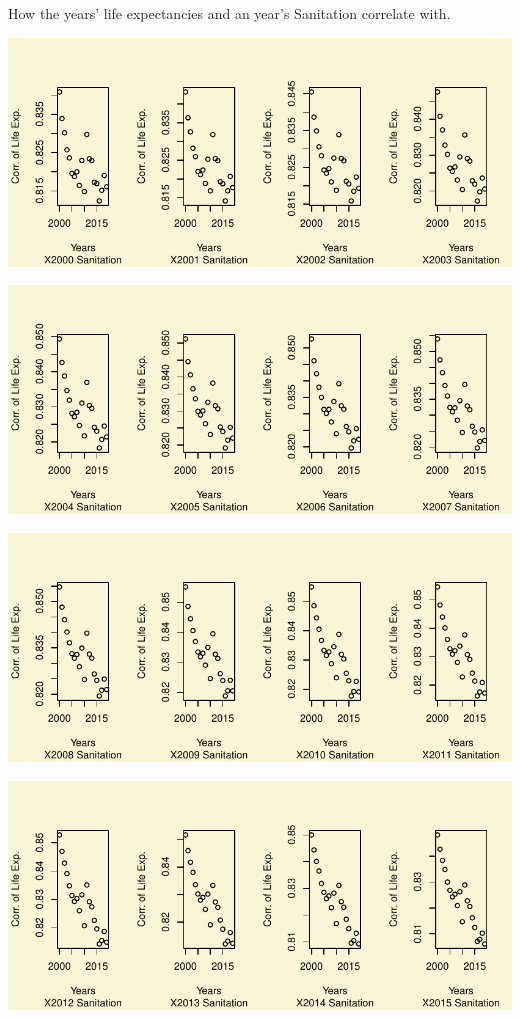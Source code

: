 \documentclass[
]{article}
\begin{document}
How the years' life expectancies and an year's Sanitation correlate
with.

\includegraphics{main_files/figure-pdf/unnamed-chunk-28-1.pdf}

\includegraphics{main_files/figure-pdf/unnamed-chunk-28-2.pdf}

\includegraphics{main_files/figure-pdf/unnamed-chunk-28-3.pdf}

\includegraphics{main_files/figure-pdf/unnamed-chunk-28-4.pdf}
\end{document}
